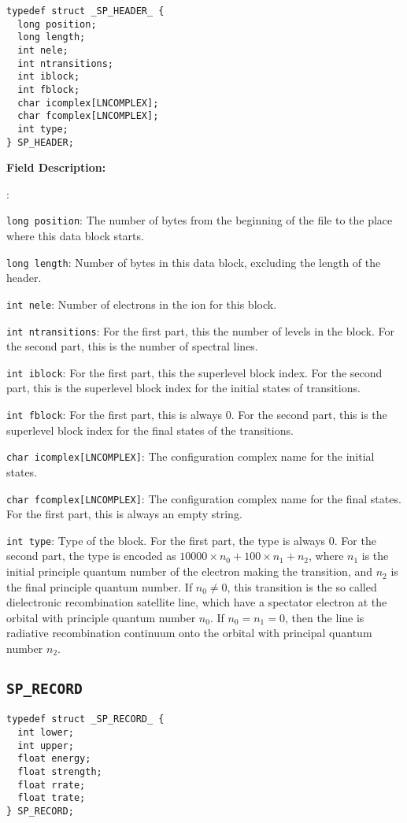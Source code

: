 \documentclass[twoside,letterpaper]{refrep}
\newenvironment{dbdesc}{\textbf{Field Description:} \begin{list}
	{:}{\setlength{\labelwidth}{2in}
	   \setlength{\leftmargin}{2in}
	   \setlength{\labelsep}{0.1in}
	   \setlength{\rightmargin}{0.2in}}}
	{\end{list}}
\begin{document}
\begin{verbatim}
typedef struct _SP_HEADER_ { 
  long position;
  long length;
  int nele;
  int ntransitions;
  int iblock;
  int fblock;
  char icomplex[LNCOMPLEX];
  char fcomplex[LNCOMPLEX];
  int type;
} SP_HEADER;
\end{verbatim}

\begin{dbdesc}
\item[\texttt{long position}:] The number of bytes from the beginning of the
file to the place where this data block starts.
\item[\texttt{long length}:] Number of bytes in this data block, excluding the
length of the header.
\item[\texttt{int nele}:] Number of electrons in the ion for this block.
\item[\texttt{int ntransitions}:] For the first part, this the number of
levels in the block. For the second part, this is the number of spectral lines.
\item[\texttt{int iblock}:] For the first part, this the superlevel block
index. For the second part, this is the superlevel block index for the initial
states of transitions.
\item[\texttt{int fblock}:] For the first part, this is always 0. For the
second part, this is the superlevel block index for the final states of the
transitions.
\item[\texttt{char icomplex[LNCOMPLEX]}:] The configuration complex name for
the initial states. 
\item[\texttt{char fcomplex[LNCOMPLEX]}:] The configuration complex name for
the final states. For the first part, this is always an empty string.
\item[\texttt{int type}:] Type of the block. For the first part, the type is
always 0. For the second part, the type is encoded as $10000\times n_0 +
100\times n_1 + n_2$, where $n_1$ is the initial principle quantum number of
the electron making the transition, and $n_2$ is the final principle quantum
number. If $n_0 \ne 0$, this transition is the so called dielectronic
recombination satellite line, which have a spectator electron at the orbital
with principle quantum number $n_0$. If $n_0=n_1=0$, then the line is
radiative recombination continuum onto the orbital with principal quantum
number $n_2$. 
\end{dbdesc}

\subsection{\texttt{SP\_RECORD}}
\begin{verbatim}
typedef struct _SP_RECORD_ {
  int lower;
  int upper;
  float energy;
  float strength;
  float rrate;
  float trate;
} SP_RECORD;
\end{verbatim}
\end{document}
